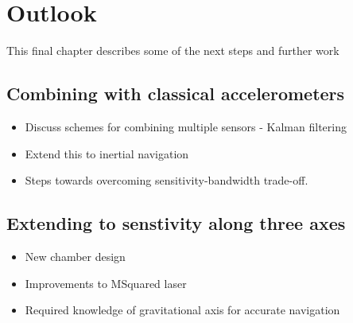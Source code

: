 \chapter{Outlook}
This final chapter describes some of the next steps and further work
\section{Combining with classical accelerometers}\label{sec:outlook_combsensors}
\begin{itemize}
    \item Discuss schemes for combining multiple sensors - Kalman filtering
    \item Extend this to inertial navigation
    \item Steps towards overcoming sensitivity-bandwidth trade-off. 
\end{itemize}
\section{Extending to senstivity along three axes}
\begin{itemize}
    \item New chamber design
    \item Improvements to MSquared laser
    \item Required knowledge of gravitational axis for accurate navigation
\end{itemize}
